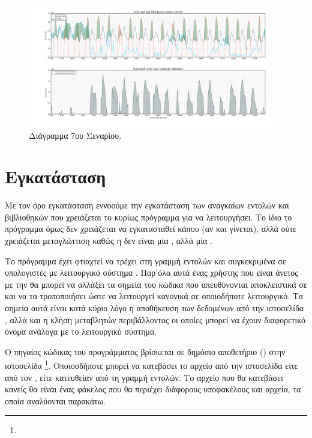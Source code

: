 \documentclass[12pt]{report}
\begin{document}
\begin{figure}
				\center
				\includegraphics[width=0.95\textwidth]{scenarios/7/plot}
				\caption{Διάγραμμα 7ου Σεναρίου.}
				\label{fig:plot7}
\end{figure}

\chapter{Εγκατάσταση}
Με τον όρο εγκατάσταση εννοούμε την εγκατάσταση των αναγκαίων εντολών και βιβλιοθηκών που χρειάζεται το κυρίως πρόγραμμα για να λειτουργήσει. Το ίδιο το πρόγραμμα όμως δεν χρειάζεται να εγκατασταθεί κάπου (αν και γίνεται), αλλά ούτε
χρειάζεται μεταγλώττιση {} καθώς η {} δεν είναι μία {}, αλλά μία {}.
 
Το πρόγραμμα έχει φτιαχτεί να τρέχει στη γραμμή εντολών και συγκεκριμένα σε υπολογιστές με λειτουργικό σύστημα {}. Παρ'όλα αυτά ένας χρήστης που είναι άνετος με την {} θα μπορεί να αλλάξει τα σημεία
του κώδικα που απευθύνονται αποκλειστικά σε {} και να τα τροποποιήσει ώστε να λειτουργεί κανονικά σε οποιοδήποτε λειτουργικό. Τα σημεία αυτά είναι κατά κύριο λόγο η αποθήκευση των δεδομένων από την ιστοσελίδα 
{}, αλλά και η κλήση μεταβλητών περιβάλλοντος {} οι οποίες μπορεί να έχουν διαφορετικό όνομα ανάλογα με το λειτουργικό σύστημα.
 
Ο πηγαίος κώδικας του προγράμματος βρίσκεται σε δημόσιο αποθετήριο ({}) στην ιστοσελίδα {}\footnote{{}}. Οποιοσδήποτε μπορεί να κατεβάσει το
αρχείο από την ιστοσελίδα είτε από τον {}, είτε κατευθείαν από τη γραμμή εντολών. Το αρχείο που θα κατεβάσει κανείς θα είναι ένας φάκελος που θα περιέχει διάφορους υποφακέλους και αρχεία, τα οποία αναλύονται 
παρακάτω. 
\end{document}
